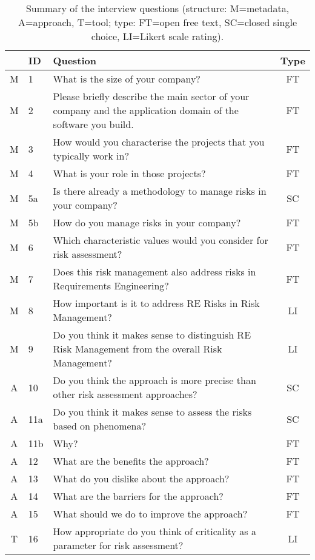 \documentclass[lnbip]{svmultln}
\begin{document}
\begin{table}[htb]
\scriptsize
\centering
\caption{Summary of the interview questions (structure: M=metadata, A=approach, T=tool; type: FT=open free text, SC=closed single choice, LI=Likert scale rating).} 
\label{tab:EQuestionnaire} 
\begin{tabular}{clp{10.4cm}c}
\toprule  
& \textbf{ID} & \textbf{Question} & \textbf{Type} \\ 
\midrule
	M & 1 & What is the size of your company? & FT\\
	M & 2 & Please briefly describe the main sector of your company and the application domain of the software you build. & FT  \\ 
	M & 3 & How would you characterise the projects that you typically work in? & FT  \\ 
	M & 4 & What is your role in those projects? & FT  \\ 
	M & 5a & Is there already a methodology to manage risks in your company? & SC\\ 
	M & 5b & How do you manage risks in your company? & FT\\ 
	M & 6 & Which characteristic values would you consider for risk assessment? &  FT \\ 
	M & 7 & Does this risk management also address risks in Requirements Engineering? &  FT \\ 
	M & 8 & How important is it to address RE Risks in Risk Management? &  LI  \\ 
	M & 9 & Do you think it makes sense to distinguish RE Risk Management from the overall Risk Management?  &  LI  \\ 
	\midrule
	A & 10 & Do you think the approach is more precise than other risk assessment approaches?  &  SC \\ 
	A & 11a &  Do you think it makes sense to assess the risks based on phenomena? & SC  \\ 
	A & 11b & Why?  &  FT \\ 
	A & 12 & What are the benefits the approach?  &  FT \\ 
	A & 13 & What do you dislike about the approach?  &  FT \\ 
	A & 14 &  What are the barriers for the approach? &  FT \\ 
	A & 15 &  What should we do to improve the approach?  & FT  \\ 
	\midrule
	T & 16 & How appropriate do you think of criticality as a parameter for risk assessment?  & LI  \\ 

\end{tabular}
\end{table}
\end{document}
